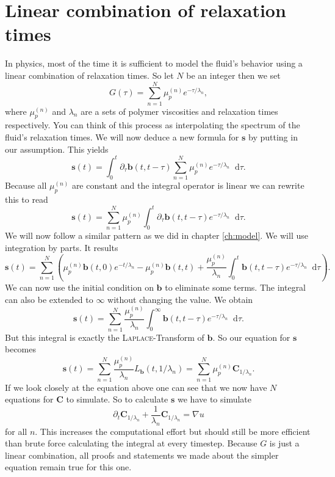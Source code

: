 \documentclass[12pt,a4paper,twoside, open=right]{scrreprt}
\theoremstyle{definition}
\theoremstyle{plain}
\newcommand{\bfb}{\bm{b}}
\newcommand{\bfs}{\bm{s}}
\newcommand{\bfC}{\bm{C}}
\newcommand{\D}{\mathop{}\!\mathrm{d}}
\begin{document}
\section{Linear combination of relaxation times}
In physics, most of the time it is sufficient to model the fluid's behavior using a linear combination of relaxation times. So let $N$ be an integer then we set
\begin{equation}
    G(\tau)=\sum_{n=1}^{N}\mu_p^{(n)}e^{-\tau/\lambda_n},
\end{equation}
where $\mu_p^{(n)}$ and $\lambda_n$ are a sets of polymer viscosities and relaxation times respectively. You can think of this process as interpolating the spectrum of the fluid's relaxation times. We will now deduce a new formula for $\bfs$ by putting in our assumption. This yields
\begin{equation}
    \bfs(t)=\int_0^t\partial_\tau \bfb(t,t-\tau)\sum_{n=1}^{N}\mu_p^{(n)}e^{-\tau/\lambda_n}\D\tau.
\end{equation}
Because all $\mu_p^{(n)}$ are constant and the integral operator is linear we can rewrite this to read
\begin{equation}
    \bfs(t) = \sum_{n=1}^{N}\mu_p^{(n)}\int_0^t\partial_\tau \bfb(t,t-\tau)e^{-\tau/\lambda_n}\D\tau.
\end{equation}
We will now follow a similar pattern as we did in chapter \ref{ch:model}. We will use integration by parts. It results
\begin{equation}
    \bfs(t)=\sum_{n=1}^{N}\left(\mu_p^{(n)}\bfb(t,0)e^{-t/\lambda_n}-\mu_p^{(n)}\bfb(t,t)+\frac{\mu_p^{(n)}}{\lambda_n}\int_0^t\bfb(t,t-\tau)e^{-\tau/\lambda_n}\D\tau \right).
\end{equation}
We can now use the initial condition on $\bfb$ to eliminate some terms. The integral can also be extended to $\infty$ without changing the value. We obtain
\begin{equation}
    \bfs(t)=\sum_{n=1}^N\frac{\mu_p^{(n)}}{\lambda_n}\int_0^\infty\bfb(t,t-\tau)e^{-\tau/\lambda_n}\D\tau.
\end{equation}
But this integral is exactly the \textsc{Laplace}-Transform of $\bfb$. So our equation for $\bfs$ becomes
\begin{equation}
    \bfs(t)=\sum_{n=1}^N\frac{\mu_p^{(n)}}{\lambda_n}L_{\bfb}(t,1/\lambda_n)=\sum_{n=1}^N\mu_p^{(n)}\bfC_{1/\lambda_n}.
\end{equation}
If we look closely at the equation above one can see that we now have $N$ equations for $\bfC$ to simulate. So to calculate $\bfs$ we have to simulate 
\begin{equation}
    \partial_t \bfC_{1/\lambda_n}+\frac{1}{\lambda_n}\bfC_{1/\lambda_n}=\nabla u
\end{equation}
for all $n$. This increases the computational effort but should still be more efficient than brute force calculating the integral at every timestep. Because $G$ is just a linear combination, all proofs and statements we made about the simpler equation remain true for this one.
\end{document}
